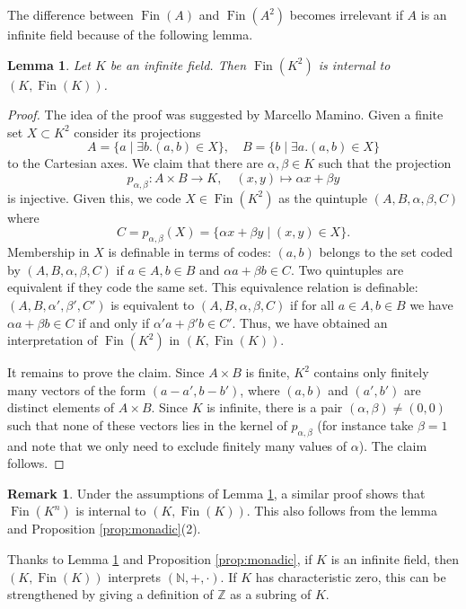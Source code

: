 \documentclass{amsart}
\newcommand{\Z}{\mathbb Z}
\newcommand{\N}{\mathbb N}
\newcommand{\Fin}{\operatorname{Fin}}
\theoremstyle{plain}
\newtheorem{lem}[thm]{Lemma}
\theoremstyle{definition}
\newtheorem{rem}[thm]{Remark}
\begin{document}
The difference between $\Fin(A)$ and $\Fin(A^2)$ becomes irrelevant if $A$ is an infinite field because of the following lemma. 

\begin{lem} \label{lem:sets-of-pairs}Let $K$ be an infinite field. Then $\Fin(K^2)$ is internal to $(K,\Fin(K))$. 
\end{lem}

\begin{proof} 
	The idea of the proof was suggested by Marcello Mamino. Given a finite set $X \subset K^2$ consider its projections $$A = \{a \mid \exists b. (a,b) \in X\}, \quad B = \{b \mid \exists a. (a,b)\in X\}$$ to the Cartesian axes. We claim that there are $\alpha, \beta \in K$ such that the projection 
	$$
	p_{\alpha, \beta}: A\times B \to K, \quad (x,y)\mapsto \alpha x + \beta y
	$$ 
	is injective. Given this, we code $X\in \Fin(K^2)$ as the quintuple $(A,B,\alpha, \beta, C)$ where 
	$$
	C = p_{\alpha, \beta}(X) = \{\alpha x + \beta y \mid (x,y) \in X\}.
	$$
	Membership in $X$ is definable in terms of codes: $(a,b)$ belongs to the set coded by $(A,B,\alpha, \beta, C)$ if $a\in A, b\in B$ and $\alpha a + \beta b \in C$. 
	Two quintuples are equivalent if they code the same set. This equivalence relation is definable: $(A,B,\alpha', \beta', C')$ is equivalent to $(A,B, \alpha, \beta, C)$ if for all $a\in A, b\in B$ we have $\alpha a + \beta b \in C$ if and only if $\alpha' a + \beta' b \in C'$. 
Thus, we have obtained an interpretation of $\Fin (K^2)$ in $(K, \Fin(K))$. 

It remains to prove the claim. Since $A\times B$ is finite, $K^2$ contains only finitely many vectors of the form $(a-a', b-b')$, where $(a,b)$ and $(a',b')$ are distinct elements of $A\times B$. 
Since $K$ is infinite, there is a pair $(\alpha, \beta) \neq (0,0)$ such that none of these vectors lies in the kernel of $p_{\alpha,\beta}$ (for instance take $\beta = 1$ and note that we only need to exclude finitely many values of $\alpha$). The claim follows. 
\end{proof}
%
\begin{rem}
Under the assumptions of Lemma \ref{lem:sets-of-pairs}, a similar proof shows that $\Fin(K^n)$ is internal to $(K,\Fin(K))$. This also follows from the lemma and Proposition \ref{prop:monadic}(2). 
\end{rem}

Thanks to Lemma \ref{lem:sets-of-pairs} and Proposition \ref{prop:monadic}, if $K$ is an infinite field, then  $(K,\Fin(K))$ interprets $(\N,+,\cdot)$. If $K$ has characteristic zero, this can be strengthened by giving a definition of $\Z$ as a subring of $K$. 
\end{document}

